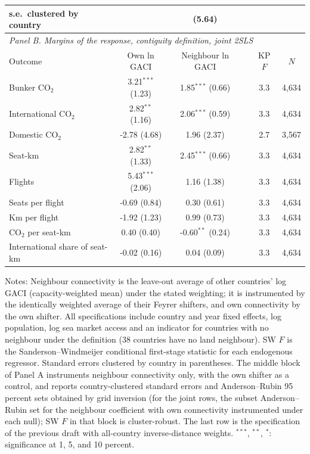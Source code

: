 \documentclass[12pt]{article}
\begin{document}
\begin{table}[H]
{\begin{threeparttable}
\begin{tabular}{lccccc}
  \quad s.e.\ clustered by country & & (5.64) & & & \\
\midrule
\multicolumn{6}{l}{\textit{Panel B. Margins of the response, contiguity definition, joint 2SLS}} \\
Outcome & Own ln GACI & Neighbour ln GACI & & KP $F$ & $N$ \\
\midrule
  Bunker CO$_2$ & 3.21$^{***}$ (1.23) & 1.85$^{***}$ (0.66) & & 3.3 & 4,634 \\
  International CO$_2$ & 2.82$^{**}$ (1.16) & 2.06$^{***}$ (0.59) & & 3.3 & 4,634 \\
  Domestic CO$_2$ & -2.78 (4.68) & 1.96 (2.37) & & 2.7 & 3,567 \\
  Seat-km & 2.82$^{**}$ (1.33) & 2.45$^{***}$ (0.66) & & 3.3 & 4,634 \\
  Flights & 5.43$^{***}$ (2.06) & 1.16 (1.38) & & 3.3 & 4,634 \\
  Seats per flight & -0.69 (0.84) & 0.30 (0.61) & & 3.3 & 4,634 \\
  Km per flight & -1.92 (1.23) & 0.99 (0.73) & & 3.3 & 4,634 \\
  CO$_2$ per seat-km & 0.40 (0.40) & -0.60$^{**}$ (0.24) & & 3.3 & 4,634 \\
  International share of seat-km & -0.02 (0.16) & 0.04 (0.09) & & 3.3 & 4,634 \\
\bottomrule
\end{tabular}
\begin{tablenotes}[flushleft]
\footnotesize
\item Notes: Neighbour connectivity is the leave-out average of other countries' log GACI (capacity-weighted mean) under the stated weighting; it is instrumented by the identically weighted average of their Feyrer shifters, and own connectivity by the own shifter. All specifications include country and year fixed effects, log population, log sea market access and an indicator for countries with no neighbour under the definition (38 countries have no land neighbour). SW $F$ is the Sanderson--Windmeijer conditional first-stage statistic for each endogenous regressor. Standard errors clustered by country in parentheses. The middle block of Panel A instruments neighbour connectivity only, with the own shifter as a control, and reports country-clustered standard errors and Anderson--Rubin 95 percent sets obtained by grid inversion (for the joint rows, the subset Anderson--Rubin set for the neighbour coefficient with own connectivity instrumented under each null); SW $F$ in that block is cluster-robust. The last row is the specification of the previous draft with all-country inverse-distance weights. $^{***}$, $^{**}$, $^{*}$: significance at 1, 5, and 10 percent.
\end{tablenotes}
\end{threeparttable}}
\end{table}
\end{document}
